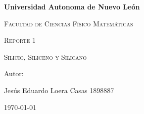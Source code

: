 \begin{titlepage}
    \centering
    \vspace{1cm}
    {\bfseries\LARGE Universidad Autonoma de Nuevo León \par}
    \vspace{1cm}
    {\scshape\Large Facultad de Ciencias Físico Matemáticas \par}
    \vspace{3cm}
    {\scshape\Huge Reporte 1  \par}
    \vspace{3cm}
    {\scshape\Huge Silicio, Siliceno y Silicano  \par}
    \vspace{3cm}
    {\Large Autor: \par}
    \vfill
    {\Large Jesús Eduardo Loera Casas 1898887 \par}
    {\Large \today \par}
\end{titlepage}